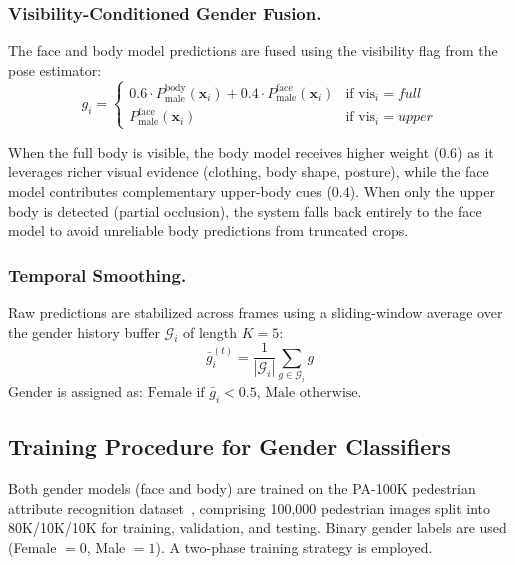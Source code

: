 \documentclass[11pt,a4paper]{article}
\begin{document}
\subsubsection{Visibility-Conditioned Gender Fusion.}
\label{subsec:gender_fusion}
The face and body model predictions are fused using the visibility flag from the pose estimator:
\begin{equation}
g_i = \begin{cases}
0.6 \cdot P_{\text{male}}^{\text{body}}(\mathbf{x}_i) + 0.4 \cdot P_{\text{male}}^{\text{face}}(\mathbf{x}_i) & \text{if vis}_i = \textit{full} \\[6pt]
P_{\text{male}}^{\text{face}}(\mathbf{x}_i) & \text{if vis}_i = \textit{upper}
\end{cases}
\label{eq:vis_fusion}
\end{equation}

When the full body is visible, the body model receives higher weight ($0.6$) as it leverages richer visual evidence (clothing, body shape, posture), while the face model contributes complementary upper-body cues ($0.4$). When only the upper body is detected (partial occlusion), the system falls back entirely to the face model to avoid unreliable body predictions from truncated crops.

\subsubsection{Temporal Smoothing.}
Raw predictions are stabilized across frames using a sliding-window average over the gender history buffer $\mathcal{G}_i$ of length $K = 5$:
\begin{equation}
\bar{g}_i^{(t)} = \frac{1}{|\mathcal{G}_i|} \sum_{g \in \mathcal{G}_i} g
\label{eq:gender_smooth}
\end{equation}
Gender is assigned as: $\text{Female if } \bar{g}_i < 0.5$, $\text{Male otherwise}$.


\subsection{Training Procedure for Gender Classifiers}
\label{subsec:gender_training}

Both gender models (face and body) are trained on the PA-100K pedestrian attribute recognition dataset~\cite{pa100k}, comprising 100,000 pedestrian images split into 80K/10K/10K for training, validation, and testing. Binary gender labels are used (Female $= 0$, Male $= 1$). A two-phase training strategy is employed.
\end{document}
